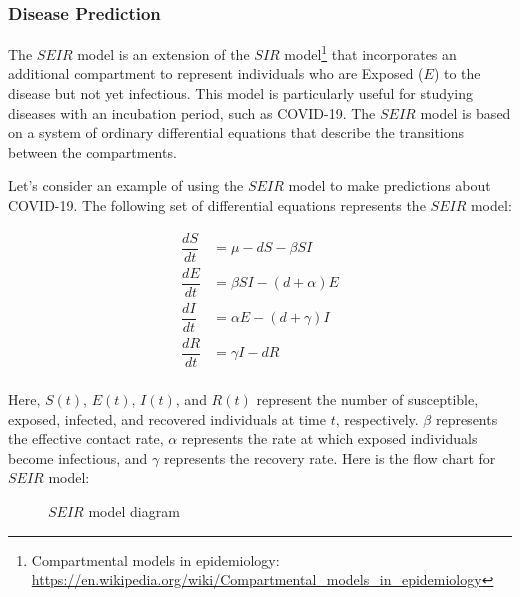 \documentclass[13pt,a4paper]{report}
\begin{document}
\subsubsection{Disease Prediction}

The $SEIR$ model is an extension of the $SIR$ model\footnote{Compartmental models in epidemiology: \url{https://en.wikipedia.org/wiki/Compartmental_models_in_epidemiology}} that incorporates an additional compartment to represent individuals who are Exposed ($E$) to the disease but not yet infectious. This model is particularly useful for studying diseases with an incubation period, such as COVID-19. The $SEIR$ model is based on a system of ordinary differential equations that describe the transitions between the compartments.

Let's consider an example of using the $SEIR$ model to make predictions about COVID-19. The following set of differential equations represents the $SEIR$ model:

$$
\begin{aligned}
\dfrac{dS}{dt} &= \mu-dS-\beta S I\\[0.2cm]
\dfrac{dE}{dt} &= \beta S I - (d+\alpha) E\\[0.2cm]
\dfrac{dI}{dt} &= \alpha E - (d+\gamma) I\\[0.2cm]
\dfrac{dR}{dt} &= \gamma I - dR\\[0.2cm]
\end{aligned}
$$

Here, $S(t)$, $E(t)$, $I(t)$, and $R(t)$ represent the number of susceptible, exposed, infected, and recovered individuals at time $t$, respectively. $\beta$ represents the effective contact rate, $\alpha$ represents the rate at which exposed individuals become infectious, and $\gamma$ represents the recovery rate. Here is the flow chart for $SEIR$ model:

\usetikzlibrary{arrows.meta,positioning}
\begin{center}
\begin{figure}[H]
\centering
{}
\caption{$SEIR$ model diagram}
\end{figure}
\end{center}
\end{document}
